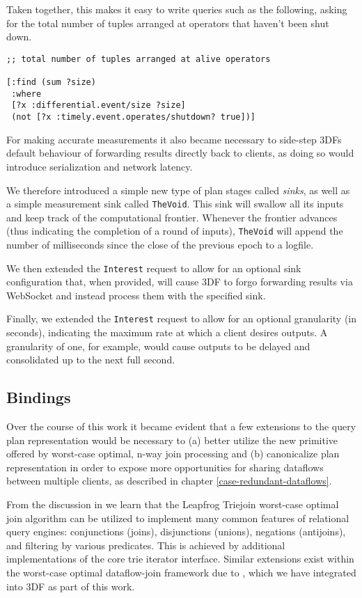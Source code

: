 \documentclass[../index.tex]{subfiles}
\begin{document}
Taken together, this makes it easy to write queries such as the
following, asking for the total number of tuples arranged at operators
that haven't been shut down.

\begin{verbatim}
;; total number of tuples arranged at alive operators

[:find (sum ?size)
 :where
 [?x :differential.event/size ?size]
 (not [?x :timely.event.operates/shutdown? true])]
\end{verbatim}

For making accurate measurements it also became necessary to
side-step 3DFs default behaviour of forwarding results directly back
to clients, as doing so would introduce serialization and network
latency.

We therefore introduced a simple new type of plan stages called
\emph{sinks}, as well as a simple measurement sink called
\texttt{TheVoid}. This sink will swallow all its inputs and keep track
of the computational frontier. Whenever the frontier advances (thus
indicating the completion of a round of inputs), \texttt{TheVoid} will
append the number of milliseconds since the close of the previous
epoch to a logfile.

We then extended the \texttt{Interest} request to allow for an
optional sink configuration that, when provided, will cause 3DF to
forgo forwarding results via WebSocket and instead process them with
the specified sink.

Finally, we extended the \texttt{Interest} request to allow for an
optional granularity (in seconds), indicating the maximum rate at
which a client desires outputs. A granularity of one, for example,
would cause outputs to be delayed and consolidated up to the next full
second.

\subsection{Bindings} \label{bindings}

Over the course of this work it became evident that a few extensions
to the query plan representation would be necessary to (a) better
utilize the new primitive offered by worst-case optimal, n-way join
processing and (b) canonicalize plan representation in order to expose
more opportunities for sharing dataflows between multiple clients, as
described in chapter \ref{case-redundant-dataflows}.

From the discussion in \cite{veldhuizen2012leapfrog} we learn that the
Leapfrog Triejoin worst-case optimal join algorithm can be utilized to
implement many common features of relational query engines:
conjunctions (joins), disjunctions (unions), negations (antijoins),
and filtering by various predicates. This is achieved by additional
implementations of the core trie iterator interface. Similar
extensions exist within the worst-case optimal dataflow-join framework
due to \cite{ammar2018distributed}, which we have integrated into 3DF
as part of this work.
\end{document}
